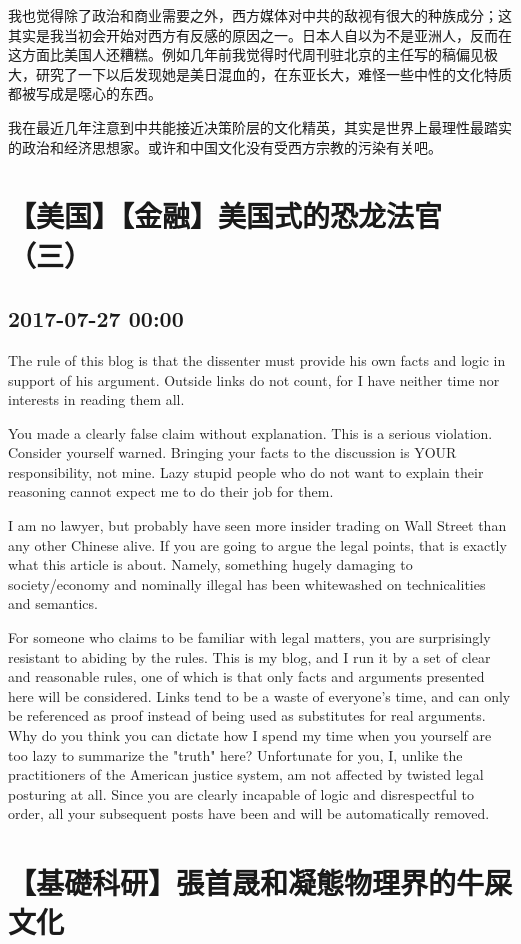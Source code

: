 \documentclass[twocolumn]{ctexart}
\begin{document}
我也觉得除了政治和商业需要之外，西方媒体对中共的敌视有很大的种族成分；这其实是我当初会开始对西方有反感的原因之一。日本人自以为不是亚洲人，反而在这方面比美国人还糟糕。例如几年前我觉得时代周刊驻北京的主任写的稿偏见极大，研究了一下以后发现她是美日混血的，在东亚长大，难怪一些中性的文化特质都被写成是噁心的东西。

我在最近几年注意到中共能接近决策阶层的文化精英，其实是世界上最理性最踏实的政治和经济思想家。或许和中国文化没有受西方宗教的污染有关吧。\section*{【美国】【金融】美国式的恐龙法官（三）}
\subsection*{2017-07-27 00:00}
The rule of this blog is that the dissenter must provide his own facts and logic in support of his argument. Outside links do not count, for I have neither time nor interests in reading them all.

You made a clearly false claim without explanation. This is a serious violation. Consider yourself warned. Bringing your facts to the discussion is YOUR responsibility, not mine. Lazy stupid people who do not want to explain their reasoning cannot expect me to do their job for them.

I am no lawyer, but probably have seen more insider trading on Wall Street than any other Chinese alive. If you are going to argue the legal points, that is exactly what this article is about. Namely, something hugely damaging to society/economy and nominally illegal has been whitewashed on technicalities and semantics.

For someone who claims to be familiar with legal matters, you are surprisingly resistant to abiding by the rules. This is my blog, and I run it by a set of clear and reasonable rules, one of which is that only facts and arguments presented here will be considered. Links tend to be a waste of everyone's time, and can only be referenced as proof instead of being used as substitutes for real arguments. Why do you think you can dictate how I spend my time when you yourself are too lazy to summarize the "truth" here? Unfortunate for you, I, unlike the practitioners of the American justice system, am not affected by twisted legal posturing at all. Since you are clearly incapable of logic and disrespectful to order, all your subsequent posts have been and will be automatically removed.\section*{【基礎科研】張首晟和凝態物理界的牛屎文化}
\end{document}
